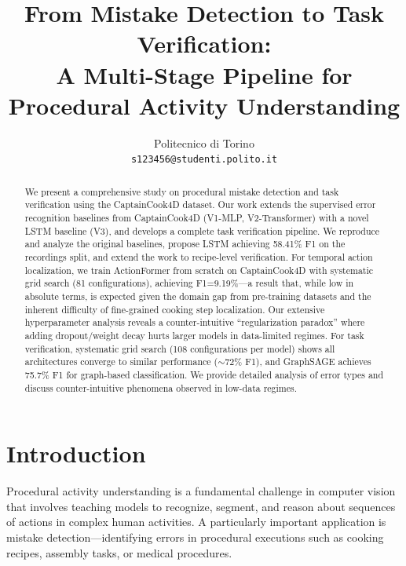 \documentclass[10pt,twocolumn,letterpaper]{article}
\begin{document}
\title{From Mistake Detection to Task Verification: \\A Multi-Stage Pipeline for Procedural Activity Understanding}

\author{
Politecnico di Torino\\
{\tt\small s123456@studenti.polito.it}
}

\maketitle

\begin{abstract}
We present a comprehensive study on procedural mistake detection and task verification using the CaptainCook4D dataset. Our work extends the supervised error recognition baselines from CaptainCook4D (V1-MLP, V2-Transformer) with a novel LSTM baseline (V3), and develops a complete task verification pipeline. We reproduce and analyze the original baselines, propose LSTM achieving 58.41\% F1 on the recordings split, and extend the work to recipe-level verification. For temporal action localization, we train ActionFormer from scratch on CaptainCook4D with systematic grid search (81 configurations), achieving F1=9.19\%---a result that, while low in absolute terms, is expected given the domain gap from pre-training datasets and the inherent difficulty of fine-grained cooking step localization. Our extensive hyperparameter analysis reveals a counter-intuitive ``regularization paradox'' where adding dropout/weight decay hurts larger models in data-limited regimes. For task verification, systematic grid search (108 configurations per model) shows all architectures converge to similar performance ($\sim$72\% F1), and GraphSAGE achieves 75.7\% F1 for graph-based classification. We provide detailed analysis of error types and discuss counter-intuitive phenomena observed in low-data regimes.
\end{abstract}

\section{Introduction}

Procedural activity understanding is a fundamental challenge in computer vision that involves teaching models to recognize, segment, and reason about sequences of actions in complex human activities. A particularly important application is mistake detection—identifying errors in procedural executions such as cooking recipes, assembly tasks, or medical procedures.
\end{document}
